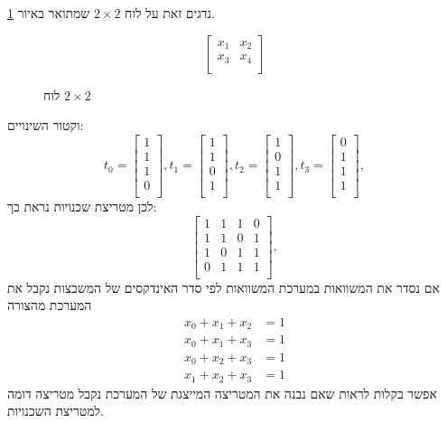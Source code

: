 \documentclass[12pt,leqno]{article}
\theoremstyle{theoremdd}
\begin{document}
נדגים זאת על לוח 
$2 \times 2$
שמתואר באיור
\ref{fig: 2 x 2 board}.
\begin{figure}[ht]
    \caption{לוח 
    $2 \times 2$
    }
    \label{fig: 2 x 2 board}
    \centering
    \[
        \begin{bmatrix}
            x_1 & x_2 \\
            x_3 & x_4 \\
        \end{bmatrix}
    \]
\end{figure}
וקטור השינויים:
\[
   t_0 = 
    \begin{bmatrix}
        1 \\
        1 \\
        1 \\
        0 \\
    \end{bmatrix},
    t_1 = 
    \begin{bmatrix}
        1 \\
        1 \\
        0 \\
        1 \\
    \end{bmatrix},
    t_2 = 
    \begin{bmatrix}
        1 \\
        0 \\
        1 \\
        1 \\
    \end{bmatrix},
    t_3 = 
    \begin{bmatrix}
        0 \\
        1 \\
        1 \\
        1 \\
    \end{bmatrix},
\]
לכן
מטריצת שכנויות נראת כך:
\[
    \begin{bmatrix}
        1 & 1 & 1 &0 \\
        1 & 1 & 0 & 1 \\
        1 & 0 & 1 & 1 \\
        0 & 1 & 1 & 1 \\
    \end{bmatrix},
\]
אם נסדר את המשוואות במערכת המשוואות לפי סדר 
האינדקסים של המשבצות נקבל את המערכת מהצורה
\begin{align*}
    x_0 + x_1 + x_2 &= 1\\
    x_0 + x_1 + x_3 &= 1\\
    x_0 + x_2 + x_3 &= 1\\
    x_1 + x_2 + x_3 &= 1
\end{align*}
אפשר בקלות לראות שאם נבנה את המטריצה המייצגת של המערכת נקבל מטריצה דומה למטריצת השכנויות.
\end{document}
